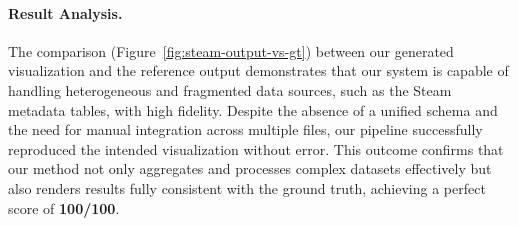 \documentclass[11pt, a4paper, logo, copyright]{googlecloud}
\begin{document}
\paragraph{Result Analysis.}
The comparison (Figure~\ref{fig:steam-output-vs-gt}) between our generated visualization and the reference output demonstrates that 
our system is capable of handling heterogeneous and fragmented data sources, such as the Steam 
metadata tables, with high fidelity. Despite the absence of a unified schema and the need for 
manual integration across multiple files, our pipeline successfully reproduced the intended 
visualization without error. This outcome confirms that our method not only aggregates and 
processes complex datasets effectively but also renders results fully consistent with the 
ground truth, achieving a perfect score of \textbf{100/100}.
\end{document}
